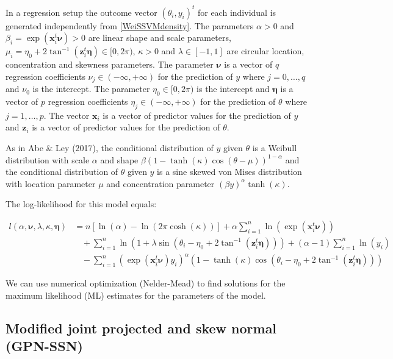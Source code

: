 \documentclass[11pt,]{article}
\begin{document}
In a regression setup the outcome vector \((\theta_i, y_i)^t\) for each
individual is generated independently from \eqref{WeiSSVMdensity}. The
parameters \(\alpha > 0\) and
\(\beta_i = \exp(\boldsymbol{x}_i^t\boldsymbol{\nu}) > 0\) are linear
shape and scale parameters,
\(\mu_i = \eta_0 + 2\tan^{-1}(\boldsymbol{z}_i^t\boldsymbol{\eta}) \in [0, 2\pi)\),
\(\kappa > 0\) and \(\lambda \in [-1, 1]\) are circular location,
concentration and skewness parameters. The parameter
\(\boldsymbol{\nu}\) is a vector of \(q\) regression coefficients
\(\nu_j \in (-\infty, +\infty)\) for the prediction of \(y\) where
\(j = 0, \dots, q\) and \(\nu_0\) is the intercept. The parameter
\(\eta_0 \in [0, 2\pi)\) is the intercept and \(\boldsymbol{\eta}\) is a
vector of \(p\) regression coefficients
\(\eta_j \in (-\infty, +\infty)\) for the prediction of \(\theta\) where
\(j = 1, \dots, p\). The vector \(\boldsymbol{x}_i\) is a vector of
predictor values for the prediction of \(y\) and \(\boldsymbol{z}_i\) is
a vector of predictor values for the prediction of \(\theta\).

As in Abe \& Ley (2017), the conditional distribution of \(y\) given
\(\theta\) is a Weibull distribution with scale \(\alpha\) and shape
\(\beta(1-\tanh(\kappa)\cos(\theta - \mu))^{1-\alpha}\) and the
conditional distribution of \(\theta\) given \(y\) is a sine skewed von
Mises distribution with location parameter \(\mu\) and concentration
parameter \((\beta y)^\alpha\tanh(\kappa)\).

The log-likelihood for this model equals:

\begin{align}\label{WeiSSVMLikelihood}
l(\alpha, \boldsymbol{\nu}, \lambda, \kappa, \boldsymbol{\eta}) 
   &= n[\ln(\alpha) - \ln(2\pi\cosh(\kappa))] + \alpha \sum^{n}_{i = 1} \ln(\exp(\boldsymbol{x}_i^t\boldsymbol{\nu})) \nonumber\\
   &\:\:\:\:+\sum^{n}_{i = 1} \ln(1 +\lambda\sin(\theta_i - \eta_0 + 2\tan^{-1}(\boldsymbol{z}_i^t\boldsymbol{\eta}))) 
   +(\alpha-1)\sum^{n}_{i = 1} \ln(y_i) \nonumber\\
   &\:\:\:\:-\sum^{n}_{i = 1}( \exp(\boldsymbol{x}_i^t\boldsymbol{\nu})y_i)^{\alpha}(1-\tanh(\kappa)\cos(\theta_i - \eta_0 + 2\tan^{-1}(\boldsymbol{z}_i^t\boldsymbol{\eta})))
\end{align}

We can use numerical optimization (Nelder-Mead) to find solutions for
the maximum likelihood (ML) estimates for the parameters of the model.

\subsection{Modified joint projected and skew normal (GPN-SSN)}\label{CL-GPN_multivariate}
\end{document}
